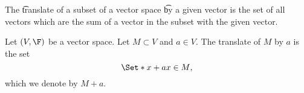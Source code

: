 


The \t{translate} of a subset of a vector space \t{by} a given vector is the set of all vectors which are the sum of a vector in the subset with the given vector.


Let $(V, \F)$ be a vector space.
Let $M \subset V$ and $a \in V$.
The translate of $M$ by $a$ is the set
$$
  \Set*{x + a}{x \in M},
$$
which we denote by $M + a$.
